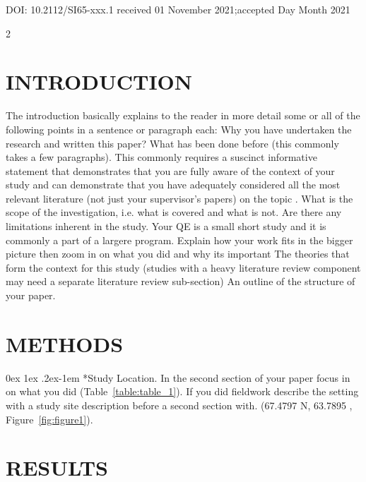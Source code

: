 \documentclass[a4paper,10pt]{article}
\makeatletter
\renewcommand{\paragraph}{%
  \@startsection{paragraph}{4}%
  {\z@}{0ex \@plus 1ex \@minus .2ex}{-1em}%
  {\normalfont\normalsize\bfseries}%
}
\makeatother
\begin{document}
\thispagestyle{empty}

\vspace{7.6cm}
DOI: 10.2112/SI65-xxx.1 received 01 November 2021;\newline accepted Day Month 2021

\newpage
\begin{multicols}{2}
\section*{INTRODUCTION}
The introduction basically explains to the reader in more detail some or all of the following points in a sentence or paragraph each:
Why you have undertaken the research and written this paper?
What has been done before (this commonly takes a few paragraphs). This commonly requires a suscinct informative statement that demonstrates that you are fully aware of the context of your study and can demonstrate that you have adequately considered all the most relevant literature (not just your supervisor’s papers) on the topic \parencite{Author1}.
What is the scope of the investigation, i.e. what is covered and what is not. Are there any limitations inherent in the study. Your QE is a small short study and it is commonly a part of a largere program. Explain how your work fits in the bigger picture then zoom in on what you did and why its important
The theories that form the context for this study (studies with a heavy literature review component may need a separate literature review sub-section)
An outline of the structure of your paper. 

\section*{METHODS}
\paragraph*{Study Location.}
In the second section of your paper focus in on what you did (Table~\ref{table:table_1}). If you did fieldwork describe the setting with a study site description before a second section with. (67.4797 \degree N, 63.7895 \degree, Figure~\ref{fig:figure1}). 


\section*{RESULTS}


\end{multicols}
\end{document}
